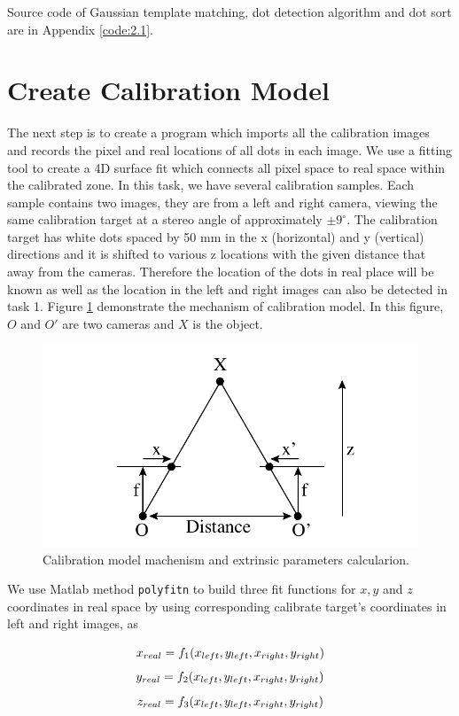 Source code of Gaussian template matching, dot detection algorithm and dot sort are in Appendix \ref{code:2.1}.

\section{Create Calibration Model}

The next step is to create a program which imports all the calibration images and records the pixel and real locations of all dots in each image. We use a fitting tool to create a 4D surface fit which connects all pixel space to real space within the calibrated zone. In this task, we have several calibration samples. Each sample contains two images, they are from a left and right camera, viewing the same calibration target at a stereo angle of approximately $\pm9^{\circ}$. The calibration target has white dots spaced by 50 mm in the x (horizontal) and y (vertical) directions and it is shifted to various z locations with the given distance that away from the cameras. Therefore the location of the dots in real place will be known as well as the location in the left and right images can also be detected in task 1. Figure \ref{fig:extrinsic} demonstrate the mechanism of calibration model. In this figure, $O$ and $O'$ are two cameras and $X$ is the object.

\begin{figure}[h!]
	\centering
	\includegraphics[width=0.6\linewidth]{figures/part2/extrinsic}
	\caption{Calibration model machenism and extrinsic parameters calcularion.}
	\label{fig:extrinsic}
\end{figure}

We use Matlab method \texttt{polyfitn} to build three fit functions for $x,y$ and $z$ coordinates in real space by using corresponding calibrate target's coordinates in left and right images, as

\begin{equation*}
	\centering
	x_{real} = f_{1}(x_{left}, y_{left}, x_{right}, y_{right}) 
\end{equation*}
\begin{equation*}
	\centering
	y_{real} = f_{2}(x_{left}, y_{left}, x_{right}, y_{right}) 
\end{equation*}
\begin{equation*}
	\centering
	z_{real} = f_{3}(x_{left}, y_{left}, x_{right}, y_{right}) 
\end{equation*}


